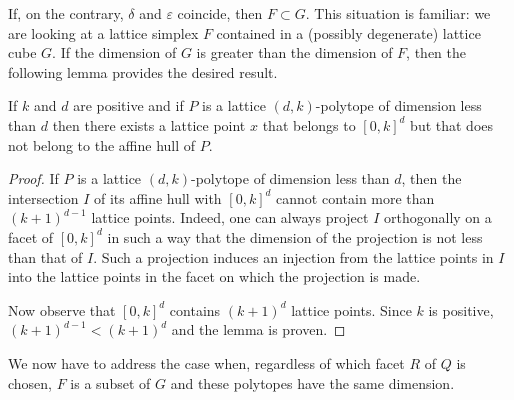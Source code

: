 If, on the contrary, $\delta$ and $\varepsilon$ coincide, then $F\subset{G}$. This situation is familiar: we are looking at a lattice simplex $F$ contained in a (possibly degenerate) lattice cube $G$. If the dimension of $G$ is greater than the dimension of $F$, then the following lemma provides the desired result.

\begin{lemma}\label{Lem.C}
If $k$ and $d$ are positive and if $P$ is a lattice $(d,k)$-polytope of dimension less than $d$ then there exists a lattice point $x$ that belongs to $[0,k]^d$ but that does not belong to the affine hull of $P$.
\end{lemma}
\begin{proof}
If $P$ is a lattice $(d,k)$-polytope of dimension less than $d$, then the intersection $I$ of its affine hull with $[0,k]^d$ cannot contain more than $(k+1)^{d-1}$ lattice points. Indeed, one can always project $I$ orthogonally on a facet of $[0,k]^d$ in such a way that the dimension of the projection is not less than that of $I$. Such a projection induces an injection from the lattice points in $I$ into the lattice points in the facet on which the projection is made.

Now observe that $[0,k]^d$ contains $(k+1)^d$ lattice points. Since $k$ is positive, $(k+1)^{d-1}<(k+1)^d$ and the lemma is proven.
\end{proof}

We now have to address the case when, regardless of which facet $R$ of $Q$ is chosen, $F$ is a subset of $G$ and these polytopes have the same dimension.

